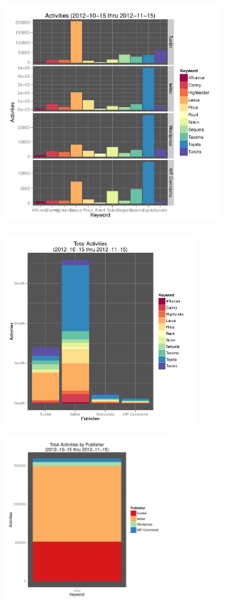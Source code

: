 \documentclass{beamer}
\begin{document}
\begin{frame}
  \begin{center}
    \includegraphics[width=8cm]{./imgs/bars.pdf}
  \end{center}
\end{frame}

\begin{frame}
  \begin{center}
    \includegraphics[width=7cm]{./imgs/bars_tot.pdf}
  \end{center}
\end{frame}

\begin{frame}
  \begin{center}
    \includegraphics[width=6cm]{./imgs/bars_stacked.pdf}
  \end{center}
\end{frame}
\end{document}
